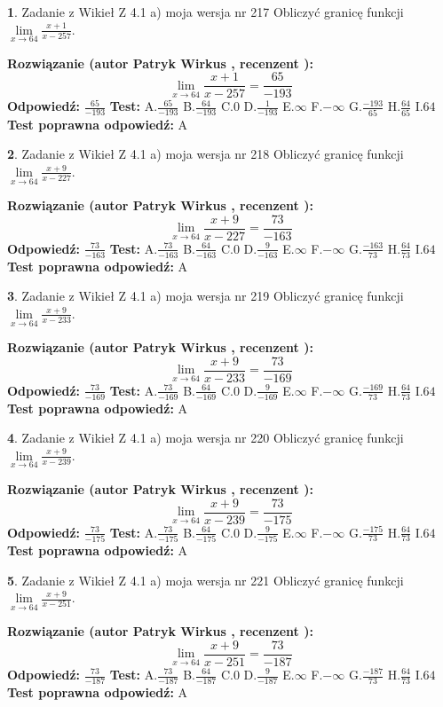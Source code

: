 \documentclass[12pt, a4paper]{article}
\theoremstyle{definition} %
\newtheorem{zad}{}
\newcommand{\zadStart}[1]{\begin{zad}#1\newline}
\newcommand{\zadStop}{\end{zad}}
\newcommand{\rozwStart}[2]{\noindent \textbf{Rozwiązanie (autor #1 , recenzent #2): }\newline}
\newcommand{\rozwStop}{\newline}
\newcommand{\odpStart}{\noindent \textbf{Odpowiedź:}\newline}
\newcommand{\odpStop}{\newline}
\newcommand{\testStart}{\noindent \textbf{Test:}\newline}
\newcommand{\testStop}{\newline}
\newcommand{\kluczStart}{\noindent \textbf{Test poprawna odpowiedź:}\newline}
\newcommand{\kluczStop}{\newline}
\begin{document}
\zadStart{Zadanie z Wikieł Z 4.1 a) moja wersja nr 217}
Obliczyć granicę funkcji $\lim\limits_{x\to64}\frac{x+1}{x-257}$.
\zadStop
\rozwStart{Patryk Wirkus}{}
$$\lim\limits_{x\to64}\frac{x+1}{x-257} = \frac{65}{-193}$$
\rozwStop
\odpStart
$\frac{65}{-193}$
\odpStop
\testStart
A.$\frac{65}{-193}$
B.$\frac{64}{-193}$
C.$0$
D.$\frac{1}{-193}$
E.$\infty$
F.$-\infty$
G.$\frac{-193}{65}$
H.$\frac{64}{65}$
I.$64$
\testStop
\kluczStart
A
\kluczStop



\zadStart{Zadanie z Wikieł Z 4.1 a) moja wersja nr 218}
Obliczyć granicę funkcji $\lim\limits_{x\to64}\frac{x+9}{x-227}$.
\zadStop
\rozwStart{Patryk Wirkus}{}
$$\lim\limits_{x\to64}\frac{x+9}{x-227} = \frac{73}{-163}$$
\rozwStop
\odpStart
$\frac{73}{-163}$
\odpStop
\testStart
A.$\frac{73}{-163}$
B.$\frac{64}{-163}$
C.$0$
D.$\frac{9}{-163}$
E.$\infty$
F.$-\infty$
G.$\frac{-163}{73}$
H.$\frac{64}{73}$
I.$64$
\testStop
\kluczStart
A
\kluczStop



\zadStart{Zadanie z Wikieł Z 4.1 a) moja wersja nr 219}
Obliczyć granicę funkcji $\lim\limits_{x\to64}\frac{x+9}{x-233}$.
\zadStop
\rozwStart{Patryk Wirkus}{}
$$\lim\limits_{x\to64}\frac{x+9}{x-233} = \frac{73}{-169}$$
\rozwStop
\odpStart
$\frac{73}{-169}$
\odpStop
\testStart
A.$\frac{73}{-169}$
B.$\frac{64}{-169}$
C.$0$
D.$\frac{9}{-169}$
E.$\infty$
F.$-\infty$
G.$\frac{-169}{73}$
H.$\frac{64}{73}$
I.$64$
\testStop
\kluczStart
A
\kluczStop



\zadStart{Zadanie z Wikieł Z 4.1 a) moja wersja nr 220}
Obliczyć granicę funkcji $\lim\limits_{x\to64}\frac{x+9}{x-239}$.
\zadStop
\rozwStart{Patryk Wirkus}{}
$$\lim\limits_{x\to64}\frac{x+9}{x-239} = \frac{73}{-175}$$
\rozwStop
\odpStart
$\frac{73}{-175}$
\odpStop
\testStart
A.$\frac{73}{-175}$
B.$\frac{64}{-175}$
C.$0$
D.$\frac{9}{-175}$
E.$\infty$
F.$-\infty$
G.$\frac{-175}{73}$
H.$\frac{64}{73}$
I.$64$
\testStop
\kluczStart
A
\kluczStop



\zadStart{Zadanie z Wikieł Z 4.1 a) moja wersja nr 221}
Obliczyć granicę funkcji $\lim\limits_{x\to64}\frac{x+9}{x-251}$.
\zadStop
\rozwStart{Patryk Wirkus}{}
$$\lim\limits_{x\to64}\frac{x+9}{x-251} = \frac{73}{-187}$$
\rozwStop
\odpStart
$\frac{73}{-187}$
\odpStop
\testStart
A.$\frac{73}{-187}$
B.$\frac{64}{-187}$
C.$0$
D.$\frac{9}{-187}$
E.$\infty$
F.$-\infty$
G.$\frac{-187}{73}$
H.$\frac{64}{73}$
I.$64$
\testStop
\kluczStart
A
\kluczStop
\end{document}
